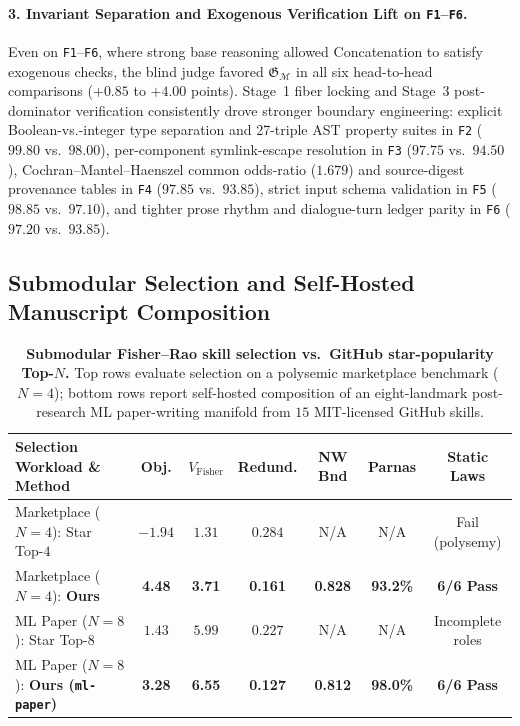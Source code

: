 \documentclass[11pt]{article}
\theoremstyle{definition}
\theoremstyle{plain}
\newcommand{\Mcal}{\mathcal{M}}
\newcommand{\Gfrak}{\mathfrak{G}}
\begin{document}
\paragraph{3. Invariant Separation and Exogenous Verification Lift on \texttt{F1}--\texttt{F6}.}
Even on \texttt{F1}--\texttt{F6}, where strong base reasoning allowed Concatenation to satisfy exogenous checks, the blind judge favored $\Gfrak_{\Mcal}$ in all six head-to-head comparisons ($+0.85$ to $+4.00$ points). Stage~1 fiber locking and Stage~3 post-dominator verification consistently drove stronger boundary engineering: explicit Boolean-vs.-integer type separation and 27-triple AST property suites in \texttt{F2} ($99.80$ vs.\ $98.00$), per-component symlink-escape resolution in \texttt{F3} ($97.75$ vs.\ $94.50$), Cochran--Mantel--Haenszel common odds-ratio ($1.679$) and source-digest provenance tables in \texttt{F4} ($97.85$ vs.\ $93.85$), strict input schema validation in \texttt{F5} ($98.85$ vs.\ $97.10$), and tighter prose rhythm and dialogue-turn ledger parity in \texttt{F6} ($97.20$ vs.\ $93.85$).

\subsection{Submodular Selection and Self-Hosted Manuscript Composition}
\label{subsec:self-hosted}

\begin{table}[t]
\centering
\caption{\textbf{Submodular Fisher--Rao skill selection vs.\ GitHub star-popularity Top-$N$.} Top rows evaluate selection on a polysemic marketplace benchmark ($N=4$); bottom rows report self-hosted composition of an eight-landmark post-research ML paper-writing manifold from $15$ MIT-licensed GitHub skills.}
\label{tab:selection}
\vspace{4pt}
\footnotesize
\setlength{\tabcolsep}{0pt}
\begin{tabular*}{\textwidth}{@{\extracolsep{\fill}}lcccccc@{}}
\toprule
\textbf{Selection Workload \& Method} & \textbf{Obj.} & $V_{\mathrm{Fisher}}$ & \textbf{Redund.} & \textbf{NW Bnd} & \textbf{Parnas} & \textbf{Static Laws} \\
\midrule
Marketplace ($N=4$): Star Top-$4$                  & $-1.94$ & $1.31$ & $0.284$ & N/A   & N/A   & Fail (polysemy) \\
Marketplace ($N=4$): \textbf{Ours}                 & \textbf{4.48}  & \textbf{3.71} & \textbf{0.161} & \textbf{0.828} & \textbf{93.2\%} & \textbf{6/6 Pass} \\
\midrule
ML Paper ($N=8$): Star Top-$8$                     & $1.43$  & $5.99$ & $0.227$ & N/A   & N/A   & Incomplete roles \\
ML Paper ($N=8$): \textbf{Ours (\texttt{ml-paper})} & \textbf{3.28} & \textbf{6.55} & \textbf{0.127} & \textbf{0.812} & \textbf{98.0\%} & \textbf{6/6 Pass} \\
\bottomrule
\end{tabular*}
\end{table}
\end{document}
